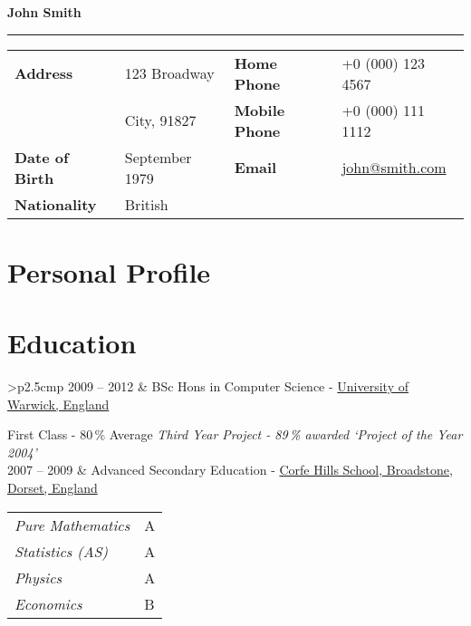 \documentclass{article}
\begin{document}
{\huge\color{slateblue}\textbf{John Smith}\par}
\rule{\textwidth}{0.5mm}\par

\vspace{5ex}

\begin{tabular}{
		>{\bfseries}p{.25\linewidth}
		p{.25\linewidth}
		>{\bfseries}p{.25\linewidth}
		p{.25\linewidth}
	}
	Address       & 123 Broadway           & Home Phone   & +0 (000) 123 4567\\
	              & City, 91827            & Mobile Phone & +0 (000) 111 1112 \\
	Date of Birth & \nth{7} September 1979 & Email        & \href{mailto:john@smith.com}{john@smith.com} \\
	Nationality   & British\\
\end{tabular}

\vspace{5ex}


\section{Personal Profile}

\blindtext


\section{Education}

\begin{tabular}{>{\bfseries}p{2.5cm}p{\linewidth-2.5cm\relax}}
	2009 -- 2012 & BSc Hons in Computer Science -
	\href{http://www.warwick.ac.uk}{University of Warwick, England} \par
	First Class - 80\,\% Average\medbreak
	\textit{Third Year Project - 89\,\% awarded `Project of the Year 2004'}\\[2ex]
	2007 -- 2009 & Advanced Secondary Education -
	\href{http://www.corfe-hills.dorset.sch.uk}{Corfe Hills School,
	Broadstone, Dorset, England}\par
	\begin{tabular}{>{\itshape}l@{\enspace}l}
		Pure Mathematics & A \\
		Statistics (AS)  & A \\
		Physics          & A \\
		Economics        & B
	\end{tabular}
\end{tabular}
\end{document}
